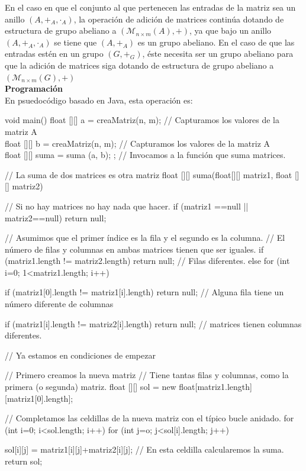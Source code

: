 \documentclass[10pt]{article}
\begin{document}
En el caso en que el conjunto al que pertenecen las entradas de la matriz sea un anillo $(A, +_A, \cdot{_A})$, la operación de adición de matrices continúa dotando de estructura de grupo abeliano a $(\mathcal{M}_{n\times {m}}(A), +)$, ya que bajo un anillo $(A, +_A, \cdot{_A})$ se tiene que $(A, +_A)$ es un grupo abeliano. En el caso de que las entradas estén en un grupo $(G, +_G)$, éste necesita ser un grupo abeliano para que la adición de matrices siga dotando de estructura de grupo abeliano a $(\mathcal{M}_{n\times {m}}(G), +)$ \\


\noindent\textbf{Programación} \\

En psuedocódigo basado en Java, esta operación es:
\begin{code}[caption=Suma de Matrices, label=default]
void main() {
  float [][] a = creaMatriz(n, m); // Capturamos los valores de la matriz A \\
  float [][] b = creaMatriz(n, m); // Capturamos los valores de la matriz A \\
  float [][] suma = suma (a, b); ; // Invocamos a la función que suma matrices. \\
} 

// La suma de dos matrices es otra matriz
float [][] suma(float[][] matriz1, float [][] matriz2) {
   // Si no hay matrices no hay nada que hacer.
   if (matriz1 ==null || matriz2==null) return null;
   
   // Asumimos que el primer índice es la fila y el segundo es la columna.
   // El número de filas y columnas en ambas matrices tienen que ser iguales.
   if (matriz1.length != matriz2.length) return null; // Filas diferentes.
   else
     for (int i=0; 1<matriz1.length; i++) {
       if (matriz1[0].length != matriz1[i].length) 
         return null; // Alguna fila tiene un número diferente de columnas
         
       if (matriz1[i].length != matriz2[i].length)
         return null; //  matrices tienen columnas diferentes.
     }
   // Ya estamos en condiciones de empezar
   
   // Primero creamos la nueva matriz
   // Tiene tantas filas y columnas, como la primera (o segunda) matriz.
   float [][] sol = new float[matriz1.length][matriz1[0].length];
   
   // Completamos las celdillas de la nueva matriz con el típico bucle anidado.
   for (int i=0; i<sol.length; i++)
     for (int j=o; j<sol[i].length; j++)
     
       sol[i][j] = matriz1[i][j]+matriz2[i][j]; // En esta celdilla calcularemos la suma.
   return sol;
}    
\end{code}
\end{document}
